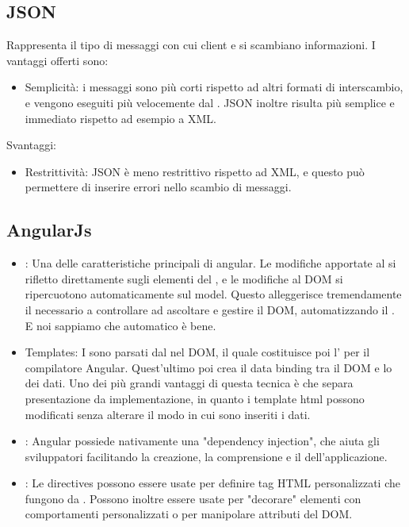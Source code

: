 \subsection{JSON}
Rappresenta il tipo di messaggi con cui client e  si scambiano informazioni. I vantaggi offerti sono:
\begin{itemize}
\item Semplicità: i messaggi  sono più corti rispetto ad altri formati di interscambio, e vengono eseguiti più velocemente dal . JSON inoltre risulta più semplice e immediato rispetto ad esempio a XML.
\end{itemize}
Svantaggi:
\begin{itemize}
\item Restrittività: JSON è meno restrittivo rispetto ad XML, e questo può permettere di inserire errori nello scambio di messaggi.
\end{itemize}

\subsection{AngularJs}
\begin{itemize}
\item {}: Una delle caratteristiche principali di angular. Le modifiche apportate al  si rifletto direttamente sugli elementi del , e le modifiche al DOM si ripercuotono automaticamente sul model. Questo alleggerisce tremendamente il  necessario a controllare ad ascoltare e gestire il DOM, automatizzando il . E noi sappiamo che automatico è bene.
\item Templates: I   sono parsati dal  nel DOM, il quale costituisce poi l' per il compilatore Angular. Quest'ultimo poi crea il data binding tra il DOM e lo  dei dati. Uno dei più grandi vantaggi di questa tecnica è che separa presentazione da implementazione, in quanto i template html possono modificati senza alterare il modo in cui sono inseriti i dati.
\item {}: Angular possiede nativamente una "dependency injection", che aiuta gli sviluppatori facilitando la creazione, la comprensione e il  dell'applicazione.
\item {}: Le directives possono essere usate per definire tag HTML personalizzati che fungono da . Possono inoltre essere usate per "decorare" elementi con comportamenti personalizzati o per manipolare attributi del DOM.

\end{itemize}

